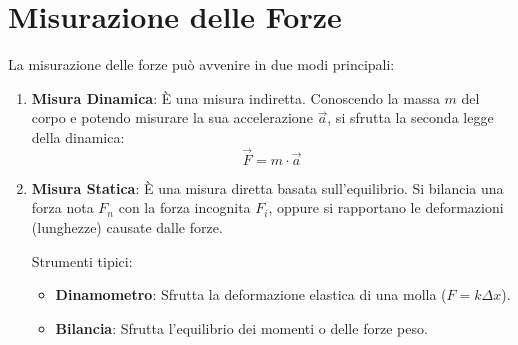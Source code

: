 \section{Misurazione delle Forze}
La misurazione delle forze può avvenire in due modi principali:

\begin{enumerate}[label=\alph*)]
    \item \textbf{Misura Dinamica}:
    È una misura indiretta. Conoscendo la massa $m$ del corpo e potendo misurare la sua accelerazione $\vec{a}$, si sfrutta la seconda legge della dinamica:
    \begin{equation}
    \vec{F} = m \cdot \vec{a}
\end{equation}
    
    \item \textbf{Misura Statica}:
    È una misura diretta basata sull'equilibrio. Si bilancia una forza nota $F_n$ con la forza incognita $F_i$, oppure si rapportano le deformazioni (lunghezze) causate dalle forze.
    
    Strumenti tipici:
    \begin{itemize}
        \item \textbf{Dinamometro}: Sfrutta la deformazione elastica di una molla ($F = k \Delta x$).
        \item \textbf{Bilancia}: Sfrutta l'equilibrio dei momenti o delle forze peso.
    \end{itemize}
    
    \begin{center}
    \end{center}
\end{enumerate}

